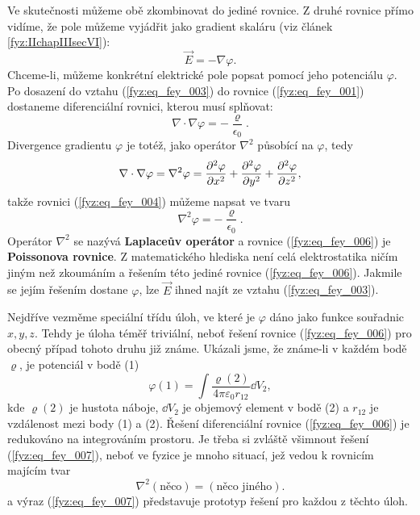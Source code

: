   Ve skutečnosti můžeme obě zkombinovat do jediné rovnice. Z druhé rovnice přímo vidíme, že pole 
  můžeme vyjádřit jako gradient skaláru (viz článek \ref{fyz:IIchapIIIsecVI}):
  \begin{equation}\label{fyz:eq_fey_003}
    \vec{E} = - \nabla\varphi.
  \end{equation}
  Chceme-li, můžeme konkrétní elektrické pole popsat pomocí jeho potenciálu \(\varphi\). Po 
  dosazení do vztahu (\ref{fyz:eq_fey_003}) do rovnice (\ref{fyz:eq_fey_001}) dostaneme 
  diferenciální rovnici, kterou musí splňovat:
  \begin{equation}\label{fyz:eq_fey_004}
  \nabla\cdot\nabla\varphi = - \dfrac{\varrho}{\epsilon_0}.
  \end{equation}
  Divergence gradientu \(\varphi\) je totéž, jako operátor \(\nabla^2\) působící na \(\varphi\), 
  tedy
  \begin{equation}\label{fyz:eq_fey_005}
  \nabla\cdot\nabla\varphi = \nabla^2\varphi 
    = \dfrac{\partial^2 \varphi}{\partial x^2} + \dfrac{\partial^2 \varphi}{\partial y^2} + \dfrac{\partial^2 \varphi}{\partial z^2},
  \end{equation}
  takže rovnici (\ref{fyz:eq_fey_004}) můžeme napsat ve tvaru
  \begin{equation}\label{fyz:eq_fey_006}
  \nabla^2\varphi = - \dfrac{\varrho}{\epsilon_0}.
  \end{equation}
  Operátor \(\nabla^2\) se nazývá \textbf{Laplaceův operátor} a rovnice (\ref{fyz:eq_fey_006}) je 
  \textbf{Poissonova rovnice}. Z matematického hlediska není celá elektrostatika ničím jiným než 
  zkoumáním a řešením této jediné rovnice (\ref{fyz:eq_fey_006}). Jakmile se jejím řešením 
  dostane \(\varphi\), lze \(\vec{E}\) ihned najít ze vztahu (\ref{fyz:eq_fey_003}).
  
  Nejdříve vezměme speciální třídu úloh, ve které je \(\varphi\) dáno jako funkce souřadnic \(x, 
  y, z\). Tehdy je úloha téměř triviální, neboť řešení rovnice (\ref{fyz:eq_fey_006}) pro obecný 
  případ tohoto druhu již známe. Ukázali jsme, že známe-li v každém bodě \(\varrho\), je 
  potenciál v bodě (1)
  \begin{equation}\label{fyz:eq_fey_007}
  \varphi(1) = \int{\dfrac{\varrho(2)}{4\pi\varepsilon_0r_{12}}}\dd{V_2},
  \end{equation}
  kde \(\varrho(2)\) je hustota náboje, \(\dd{V_2}\) je objemový element v bodě (2) a \(r_{12}\) 
  je vzdálenost mezi body (1) a (2). Řešení diferenciální rovnice (\ref{fyz:eq_fey_006}) je 
  redukováno na integrováním prostoru. Je třeba si zvláště všimnout řešení 
  (\ref{fyz:eq_fey_007}), neboť ve fyzice je mnoho situací, jež vedou k rovnicím majícím tvar
  \begin{equation}\label{fyz:eq_fey_008}
  \nabla^2(\text{něco}) = (\text{něco jiného}).
  \end{equation}
  a výraz (\ref{fyz:eq_fey_007}) představuje prototyp řešení pro každou z těchto úloh.
  

